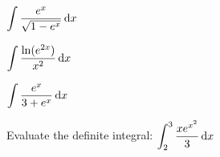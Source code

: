 \documentclass[10pt]{amsart}
\begin{document}
\vspace{2in}

\begin{thm}
  $\displaystyle{\int\frac{e^x}{\sqrt{1-e^x}}\dif x}$
\end{thm}

\vspace{2in}

\begin{thm}
  $\displaystyle{\int\frac{\ln(e^{2x})}{x^2}\dif x}$
  \end{thm}

\vspace{2in}

\begin{thm}
  $\displaystyle{\int\frac{e^x}{3+e^x}\dif x}$
\end{thm}

\vspace{2in}

\begin{thm}
  Evaluate the definite integral: $\displaystyle{\int_2^3\frac{xe^{x^2}}{3}\dif x}$
  \end{thm}
\end{document}

